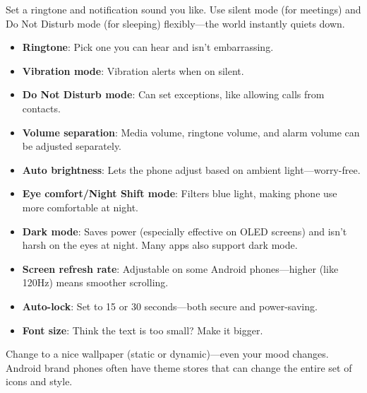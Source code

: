 


Set a ringtone and notification sound you like. Use silent mode (for meetings) and Do Not Disturb mode (for sleeping) flexibly—the world instantly quiets down.

\begin{itemize}
  \item \textbf{Ringtone}: Pick one you can hear and isn't embarrassing.
  \item \textbf{Vibration mode}: Vibration alerts when on silent.
  \item \textbf{Do Not Disturb mode}: Can set exceptions, like allowing calls from contacts.
  \item \textbf{Volume separation}: Media volume, ringtone volume, and alarm volume can be adjusted separately.
\end{itemize}


\begin{itemize}
  \item \textbf{Auto brightness}: Lets the phone adjust based on ambient light—worry-free.
  \item \textbf{Eye comfort/Night Shift mode}: Filters blue light, making phone use more comfortable at night.
  \item \textbf{Dark mode}: Saves power (especially effective on OLED screens) and isn't harsh on the eyes at night. Many apps also support dark mode.
  \item \textbf{Screen refresh rate}: Adjustable on some Android phones—higher (like 120Hz) means smoother scrolling.
  \item \textbf{Auto-lock}: Set to 15 or 30 seconds—both secure and power-saving.
  \item \textbf{Font size}: Think the text is too small? Make it bigger.
\end{itemize}


Change to a nice wallpaper (static or dynamic)—even your mood changes. Android brand phones often have theme stores that can change the entire set of icons and style.

